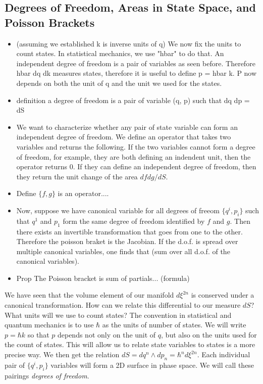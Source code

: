 \documentclass{article}
\begin{document}
\subsection{Degrees of Freedom, Areas in State Space, and Poisson Brackets}
\begin{itemize}
	
	\item (assuming we established k is inverse units of q) We now fix the units to count states. In statistical mechanics, we use "hbar" to do that. An independent degree of freedom is a pair of variables as seen before. Therefore hbar dq dk measures states, therefore it is useful to define p = hbar k. P now depends on both the unit of q and the unit we used for the states.
	
	\item definition a degree of freedom is a pair of variable (q, p) such that dq dp = dS
	
	\item We want to characterize whether any pair of state variable can form an independent degree of freedom. We define an operator that takes two variables and returns the following. If the two variables cannot form a degree of freedom, for example, they are both defining an indendent unit, then the operator returns 0. If they can define an independent degree of freedom, then they return the unit change of the area $df dg/dS$.
	
	\item Define $\{ f , g\}$ is an operator....
	
	\item Now, suppose we have canonical variable for all degrees of freeom $\{q^i, p_i\}$ such that $q^1$ and $p_1$ form the same degree of freedom identified by $f$ and $g$. Then there exists an invertible transformation that goes from one to the other. Therefore the poisson braket is the Jacobian. If the d.o.f. is spread over multiple canonical variables, one finds that (sum over all d.o.f. of the canonical variables).
	
	\item Prop The Poisson bracket is sum of partials... (formula)
\end{itemize}

	We have seen that the volume element of our manifold $d \xi^{2n}$ is conserved under a canonical transformation. How can we relate this differential to our measure $dS$? What units will we use to count states? The convention in statistical and quantum mechanics is to use $\hbar$ as the units of number of states. We will write $p = \hbar k$ so that $p$ depends not only on the unit of $q$, but also on the units used for the count of states. This will allow us to relate state variables to states is a more precise way. We then get the relation $dS = dq^n \land dp_n = \hbar^n d\xi^{2n}$. Each individual pair of $\{q^i,p_i\}$  variables will form a 2D surface in phase space. We will call these pairings \textit{degrees of freedom}.
\end{document}

